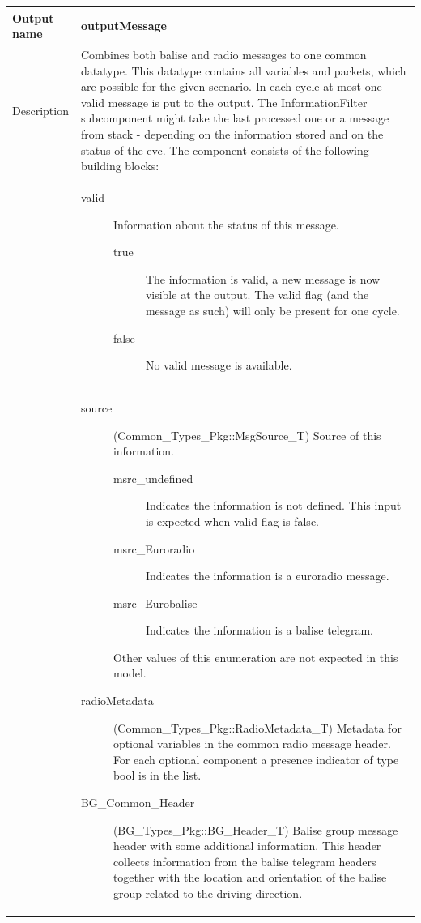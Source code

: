 \begin{longtable}{p{}p{}}
\toprule
Output name				& outputMessage \\
\midrule
Description				& Combines both balise and radio messages to one common datatype. This datatype contains all variables and packets, which are possible for the given scenario. In each cycle at most one valid message is put to the output. The InformationFilter subcomponent might take the last processed one or a message from stack - depending on the information stored and on the status of the evc. The component consists of the following building blocks:\\
&
\begin{description}
\item[valid] Information about the status of this message.
\begin{description}
\item[true] The information is valid, a new message is now visible at the output. The valid flag (and the message as such) will only be present for one cycle.
\item[false] No valid message is available.
\end{description}
\end{description}\\
&
\begin{description}
\item[source](Common\_Types\_Pkg::MsgSource\_T) Source of this information. 
\begin{description}
\item[msrc\_undefined] Indicates the information is not defined. This input is expected when valid flag is false.
\item[msrc\_Euroradio] Indicates the information is a euroradio message.
\item[msrc\_Eurobalise] Indicates the information is a balise telegram.
\end{description}
Other values of this enumeration are not expected in this model.
\item[radioMetadata](Common\_Types\_Pkg::RadioMetadata\_T) Metadata for optional variables in the common radio message header. For each optional component a presence indicator of type bool is in the list.  
\item[BG\_Common\_Header](BG\_Types\_Pkg::BG\_Header\_T) Balise group message header with some additional information. This header collects information from the balise telegram headers together with the location and orientation of the balise group related to the driving direction.


\end{description}
\end{longtable}
